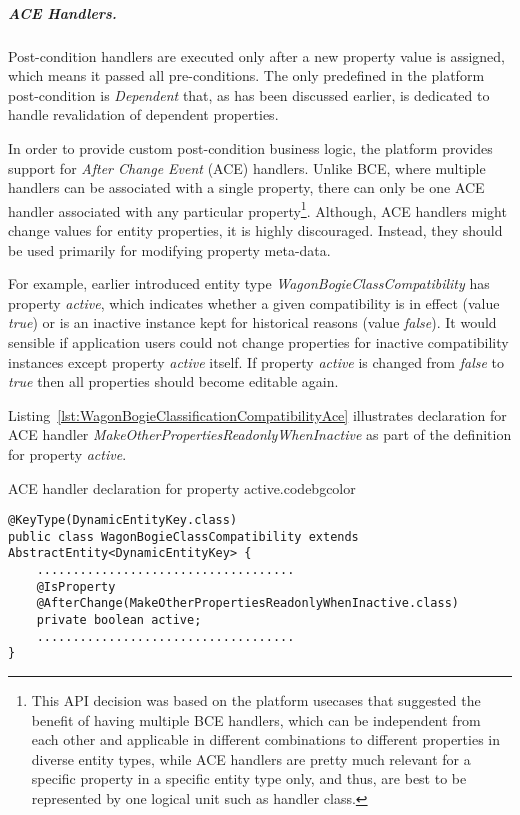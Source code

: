   \subparagraph*{ACE Handlers.}

  Post-condition handlers are executed only after a new property value is assigned, which means it passed all pre-conditions.
  The only predefined in the platform post-condition is \emph{Dependent} that, as has been discussed earlier, is dedicated to handle revalidation of dependent properties.
  
  In order to provide custom post-condition business logic, the platform provides support for \emph{After Change Event} (ACE) handlers.
  Unlike BCE, where multiple handlers can be associated with a single property, there can only be one ACE handler associated with any particular property\footnote{This API decision was based on the platform usecases that suggested the benefit of having multiple BCE handlers, which can be independent from each other and applicable in different combinations to different properties in diverse entity types, while ACE handlers are pretty much relevant for a specific property in a specific entity type only, and thus, are best to be represented by one logical unit such as handler class.}.
  Although, ACE handlers might change values for entity properties, it is highly discouraged.
  Instead, they should be used primarily for modifying property meta-data.
  
  For example, earlier introduced entity type \emph{WagonBogieClassCompatibility} has property \emph{active}, which indicates whether a given compatibility is in effect (value \emph{true}) or is an inactive instance kept for historical reasons (value \emph{false}).
  It would sensible if application users could not change properties for inactive compatibility instances except property \emph{active} itself.
  If property \emph{active} is changed from \emph{false} to \emph{true} then all properties should become editable again.
  
  Listing~\ref{lst:WagonBogieClassificationCompatibilityAce} illustrates declaration for ACE handler \emph{MakeOtherPropertiesReadonlyWhenInactive} as part of the definition for property \emph{active}.

  \begin{code}{ACE handler declaration for property active.}{\label{lst:WagonBogieClassificationCompatibilityAce}}{codebgcolor}
    \begin{lstlisting}
@KeyType(DynamicEntityKey.class)
public class WagonBogieClassCompatibility extends AbstractEntity<DynamicEntityKey> {
    ....................................
    @IsProperty
    @AfterChange(MakeOtherPropertiesReadonlyWhenInactive.class)
    private boolean active;
    ....................................
}
    \end{lstlisting}
  \end{code}

